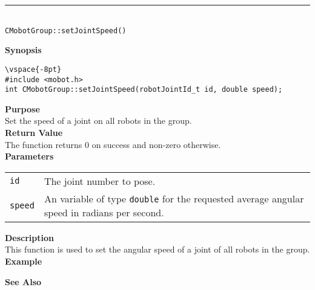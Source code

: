\noindent
\vspace{5pt}
\rule{4.5in}{0.015in}\\
\noindent
{\LARGE \texttt{CMobotGroup::setJointSpeed()}}\\
{}

\noindent
{\bf Synopsis}
\begin{verbatim}
\vspace{-8pt}
#include <mobot.h>
int CMobotGroup::setJointSpeed(robotJointId_t id, double speed);
\end{verbatim}

\noindent
{\bf Purpose}\\
Set the speed of a joint on all robots in the group.\\

\noindent
{\bf Return Value}\\
The function returns 0 on success and non-zero otherwise.\\

\noindent
{\bf Parameters}
\vspace{-0.1in}
\begin{description}
\item               
\begin{tabular}{p{10 mm}p{145 mm}}
\texttt{id} & The joint number to pose. \\
\texttt{speed} & An variable of type \texttt{double} for the requested average
angular speed in radians per second.
\end{tabular}
\end{description}

\noindent
{\bf Description}\\
This function is used to set the angular speed of a joint of all robots in the group. 
\noindent\\
{\bf Example}\\
\noindent

\noindent
{\bf See Also}\\

